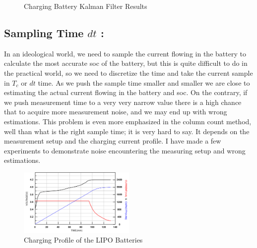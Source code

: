 \begin{figure}[h]
	\qquad
	\caption{Charging Battery Kalman Filter Results}
	\label{fig:Charging_Battery_Kalman_Filter_Results}
\end{figure}

\subsection{Sampling Time $dt$ :}
In an ideological world, we need to sample the current flowing in the battery to calculate the most accurate soc of the battery, but this is quite difficult to do in the practical world, so we need to discretize the time and take the current sample in $T_c$  or $dt$ time.  As we push the sample time smaller and smaller we are close to estimating the actual current flowing in the battery and soc. On the contrary, if we push measurement time to a very very narrow value there is a high chance that to acquire more measurement noise, and we may end up with wrong estimations. This problem is even more emphasized in the column count method,  well than what is the right sample time; it is very hard to say. It depends on the measurement setup and the charging current profile. I have made a few experiments to demonstrate noise encountering the measuring setup and wrong estimations. 

\begin{figure}
    \centering
    \includegraphics[width=0.5\textwidth]{Chap07/pyKalmanFilter/Python/Figures/Charging-curve-for-Lithium-polymer-battery.png}
	\caption{Charging Profile of the LIPO Batteries}
	\label{fig:Charging_Profile_of_the _LIPO_Batteries}
\end{figure}

